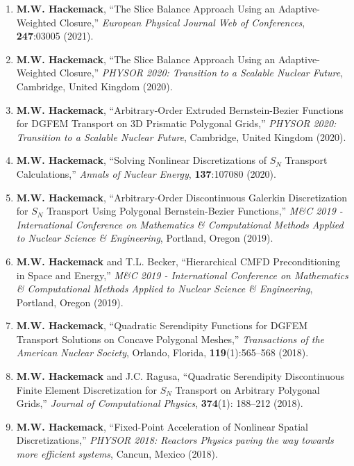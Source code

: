 \documentclass[10pt]{article}
\makeatletter
\newlength{\bibhang}
\newlength{\bibsep}
 {\@listi \global\bibsep\itemsep \global\advance\bibsep by\parsep}
\newenvironment{bibsection}%
        {\begin{enumerate}{}{%
       \setlength{\leftmargin}{\bibhang}%
       \setlength{\itemindent}{-\leftmargin}%
       \setlength{\itemsep}{\bibsep}%
       \setlength{\parsep}{\z@}%
        \setlength{\partopsep}{0pt}%
        \setlength{\topsep}{0pt}}}
        {\end{enumerate}\vspace{-.6\baselineskip}}
\makeatother
\begin{document}
\begin{bibsection}
\item \textbf{M.W. Hackemack}, ``The Slice Balance Approach Using an Adaptive-Weighted Closure,'' \textit{European Physical Journal Web of Conferences}, \textbf{247}:03005 (2021).

\item \textbf{M.W. Hackemack}, ``The Slice Balance Approach Using an Adaptive-Weighted Closure,'' \textit{PHYSOR 2020: Transition to a Scalable Nuclear Future}, Cambridge, United Kingdom (2020).

\item \textbf{M.W. Hackemack}, ``Arbitrary-Order Extruded Bernstein-Bezier Functions for DGFEM Transport on 3D Prismatic Polygonal Grids,'' \textit{PHYSOR 2020: Transition to a Scalable Nuclear Future}, Cambridge, United Kingdom (2020).

\item \textbf{M.W. Hackemack}, ``Solving Nonlinear Discretizations of $S_N$ Transport Calculations,'' \textit{Annals of Nuclear Energy}, \textbf{137}:107080 (2020).

\item \textbf{M.W. Hackemack}, ``Arbitrary-Order Discontinuous Galerkin Discretization for $S_N$ Transport Using Polygonal Bernstein-Bezier Functions,'' \textit{M\&C 2019 - International Conference on Mathematics \& Computational Methods Applied to Nuclear Science \& Engineering}, Portland, Oregon (2019).

\item \textbf{M.W. Hackemack} and T.L. Becker, ``Hierarchical CMFD Preconditioning in Space and Energy,'' \textit{M\&C 2019 - International Conference on Mathematics \& Computational Methods Applied to Nuclear Science \& Engineering}, Portland, Oregon (2019).

\item \textbf{M.W. Hackemack}, ``Quadratic Serendipity Functions for DGFEM Transport Solutions on Concave Polygonal Meshes,'' \textit{Transactions of the American Nuclear Society}, Orlando, Florida, \textbf{119}(1):565--568 (2018).

\item \textbf{M.W. Hackemack} and J.C. Ragusa, ``Quadratic Serendipity Discontinuous Finite Element Discretization
for $S_N$ Transport on Arbitrary Polygonal Grids,'' \textit{Journal of Computational Physics}, \textbf{374}(1): 188--212 (2018).

\item \textbf{M.W. Hackemack}, ``Fixed-Point Acceleration of Nonlinear Spatial Discretizations,'' \textit{PHYSOR 2018: Reactors Physics paving the way towards more efficient systems}, Cancun, Mexico (2018).


\end{bibsection}
\end{document}
